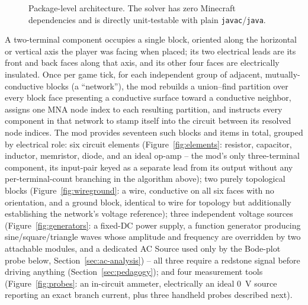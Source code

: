 \begin{figure}[htbp]
\caption{Package-level architecture. The solver has zero Minecraft dependencies and is
directly unit-testable with plain \texttt{javac}/\texttt{java}.}
\label{fig:architecture}
\end{figure}

A two-terminal component occupies a single block, oriented along the horizontal or vertical
axis the player was facing when placed; its two electrical leads are its front and back
faces along that axis, and its other four faces are electrically insulated. Once per game
tick, for each independent group of adjacent, mutually-conductive blocks (a ``network''), the
mod rebuilds a union--find partition over every block face presenting a conductive surface
toward a conductive neighbor, assigns one MNA node index to each resulting partition, and
instructs every component in that network to stamp itself into the circuit between its
resolved node indices. The mod provides seventeen such blocks and items in total, grouped by
electrical role: six circuit elements (Figure~\ref{fig:elements}: resistor, capacitor,
inductor, memristor, diode, and an ideal op-amp -- the mod's only three-terminal component,
its input-pair keyed as a separate lead from its output without any per-terminal-count
branching in the algorithm above); two purely topological blocks (Figure~\ref{fig:wireground}:
a wire, conductive on all six faces with no orientation, and a ground block, identical to wire
for topology but additionally establishing the network's voltage reference); three
independent voltage sources (Figure~\ref{fig:generators}: a fixed-DC power supply, a function
generator producing sine/square/triangle waves whose amplitude and frequency are overridden
by two attachable modules, and a dedicated AC Source used only by the Bode-plot probe below,
Section~\ref{sec:ac-analysis}) -- all three require a redstone signal before driving anything
(Section~\ref{sec:pedagogy}); and four measurement tools (Figure~\ref{fig:probes}: an
in-circuit ammeter, electrically an ideal 0~V source reporting an exact branch current, plus
three handheld probes described next).

